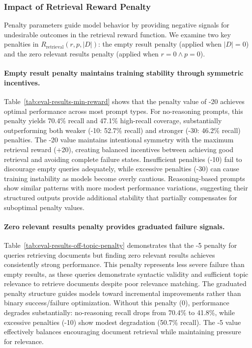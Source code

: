 \subsubsection{Impact of Retrieval Reward Penalty}



Penalty parameters guide model behavior by providing negative signals for undesirable outcomes in the retrieval reward function. We examine two key penalties in $R_{\text{retrieval}}(r, p, |D|)$: the empty result penalty (applied when $|D| = 0$) and the zero relevant results penalty (applied when $r = 0 \land p = 0$).

\paragraph{Empty result penalty maintains training stability through symmetric incentives.} Table~\ref{tab:eval-results-min-reward} shows that the penalty value of -20 achieves optimal performance across most prompt types. For no-reasoning prompts, this penalty yields 70.4\% recall and 47.1\% high-recall coverage, substantially outperforming both weaker (-10: 52.7\% recall) and stronger (-30: 46.2\% recall) penalties. The -20 value maintains intentional symmetry with the maximum retrieval reward (+20), creating balanced incentives between achieving good retrieval and avoiding complete failure states. Insufficient penalties (-10) fail to discourage empty queries adequately, while excessive penalties (-30) can cause training instability as models become overly cautious. Reasoning-based prompts show similar patterns with more modest performance variations, suggesting their structured outputs provide additional stability that partially compensates for suboptimal penalty values.

\paragraph{Zero relevant results penalty provides graduated failure signals.} Table~\ref{tab:eval-results-off-topic-penalty} demonstrates that the -5 penalty for queries retrieving documents but finding zero relevant results achieves consistently strong performance. This penalty represents less severe failure than empty results, as these queries demonstrate syntactic validity and sufficient topic relevance to retrieve documents despite poor relevance matching. The graduated penalty structure guides models toward incremental improvements rather than binary success/failure optimization. Without this penalty (0), performance degrades substantially: no-reasoning recall drops from 70.4\% to 41.8\%, while excessive penalties (-10) show modest degradation (50.7\% recall). The -5 value effectively balances encouraging document retrieval while maintaining pressure for relevance.



